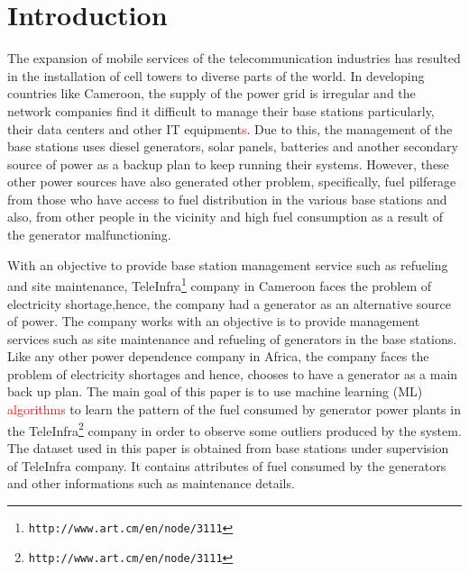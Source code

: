 \documentclass[a4paper,fleqn]{cas-dc}
\newcommand\mycorrections[1]{\textcolor{red}{#1}}
\begin{document}
\maketitle

\section{Introduction}

The expansion of mobile services of the telecommunication industries has resulted in the installation of cell towers to diverse parts of the world. In developing countries like Cameroon, the supply of the power grid is irregular and the network companies find it difficult to manage their base stations particularly, their data centers and other IT equipment\mycorrections{s}. Due to this, the management of the base stations uses diesel generators, solar panels, batteries and another secondary source of power as a backup plan to keep running their systems. However, these other power sources have also generated other problem, specifically, fuel pilferage from those who have access to fuel distribution in the various base stations and also, from other people in the vicinity and high fuel consumption as a result of the generator malfunctioning.

With an objective to provide base station management service such as refueling and site maintenance, TeleInfra\footnote{{\tt http://www.art.cm/en/node/3111}} company in Cameroon faces the problem of electricity shortage\mycorrections{,}hence\mycorrections{,} the company had a generator as an alternative source of power. The company works with an objective is to provide management services such as site maintenance and refueling of generators in the base stations. Like any other power dependence company in Africa, 
the company faces the problem of electricity shortages and hence, chooses to have a generator as a main back up plan. The main goal of this paper is to use machine learning (ML) \mycorrections{algorithms} to learn the pattern of the fuel consumed by generator power plants in the 
TeleInfra\footnote{{\tt http://www.art.cm/en/node/3111}} company in order to observe some outliers produced by the system. The dataset used in this paper is obtained from  base stations  under supervision of TeleInfra company. It contains attributes of fuel consumed by the generators and other informations such as maintenance details.
\end{document}
